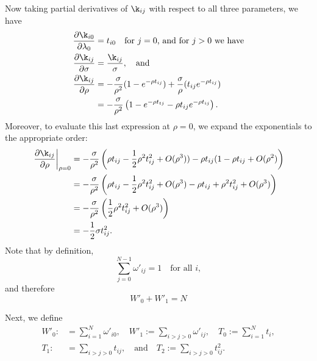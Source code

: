 \documentclass[12pt,leqno]{article}
\begin{document}
Now taking partial derivatives of $\k_{ij}$ with respect to all three parameters, we have
\begin{equation}\label{dk_dparams}
  \begin{split}
    \frac{\partial\k_{i0}}{\partial\lambda_0} &= 
        t_{i0} \quad\text{for $j = 0$, and for $j > 0$ we have}\\
    \frac{\partial\k_{ij}}{\partial\sigma} &= 
      \frac{\k_{ij}}{\sigma}, \quad\text{and}\\
    \frac{\partial\k_{ij}}{\partial\rho} &= -\frac{\sigma}{\rho^2}(1-e^{-\rho t_{ij}}) + \frac{\sigma}{\rho}(t_{ij}e^{-\rho t_{ij}}) \\
    &= -\frac{\sigma}{\rho^2}\left(1-e^{-\rho{t_{tj}}} - \rho{t_{ij}}e^{-\rho{t_{ij}}}\right).\\
  \end{split}
\end{equation}
Moreover, to evaluate this last expression at $\rho = 0$, we expand the exponentials to the appropriate order:
\begin{equation}\label{dk_drho(0)}
  \begin{split}
    \left.\frac{\partial\k_{ij}}{\partial\rho}\right|_{\rho=0} &=
    -\frac{\sigma}{\rho^2}\left(\rho t_{ij} - \frac{1}{2}\rho^2t_{ij}^2 + O(\rho^3)) - \rho t_{ij}(1 - \rho t_{ij} + O(\rho^2)\right)\\
      &= -\frac{\sigma}{\rho^2}\left(\rho t_{ij} - \frac{1}{2}\rho^2t_{ij}^2 + O(\rho^3) - \rho t_{ij} + \rho^2 t_{ij}^2 + O(\rho^3)\right)\\
        &= -\frac{\sigma}{\rho^2}\left(\frac{1}{2}\rho^2t_{ij}^2 + O(\rho^3)\right)\\
          &= -\frac{1}{2}\sigma t_{ij}^2.
\end{split}
\end{equation}
Note that by definition,
$$
\sum_{j=0}^{N-1}\omega'_{ij} = 1\quad\text{for all } i,
$$
and therefore
\begin{equation}\label{W0+W1}
  W'_0 + W'_1 = N
\end{equation}

Next, we define
\begin{align*}
  W'_0 :&= \sum_{i=1}^N\omega'_{i0},\quad  W'_1 := \sum_{i>j>0}\omega'_{ij},\quad T_0 := \sum_{i=1}^Nt_i,\\
  T_1 :&= \sum_{i>j>0}t_{ij},\quad\text{and}\quad T_2 := \sum_{i>j>0}t_{ij}^2.
\end{align*}
\end{document}
